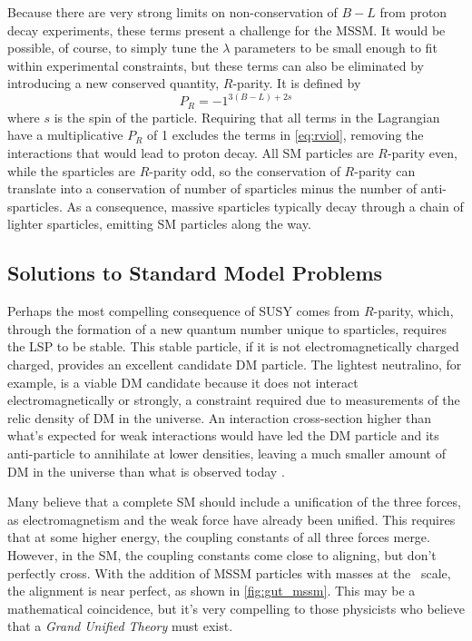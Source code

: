 Because there are very strong limits on non-conservation of $B-L$ from proton decay experiments, these terms present a challenge for the \ac{MSSM}. It would be possible, of course, to simply tune the $\lambda$ parameters to be small enough to fit within experimental constraints, but these terms can also be eliminated by introducing a new conserved quantity, $R$-parity. It is defined by
%
\begin{equation}
P_R = -1^{3(B-L)+2s}
\end{equation}
%
where $s$ is the spin of the particle. Requiring that all terms in the Lagrangian have a multiplicative $P_R$ of 1 excludes the terms in \autoref{eq:rviol}, removing the interactions that would lead to proton decay. All \ac{SM} particles are $R$-parity even, while the sparticles are $R$-parity odd, so the conservation of $R$-parity can translate into a conservation of number of sparticles minus the number of anti-sparticles. As a consequence, massive sparticles typically decay through a chain of lighter sparticles, emitting \ac{SM} particles along the way.  

\subsection{Solutions to Standard Model Problems}

Perhaps the most compelling consequence of \ac{SUSY} comes from $R$-parity, which, through the formation of a new quantum number u\-nique to sparticles, requires the \acf{LSP} to be stable. This stable particle, if it is not electromagnetically charged charged, provides an excellent candidate \ac{DM} particle. The lightest neutralino, for example, is a viable \ac{DM} candidate because it does not interact electromagnetically or strongly, a constraint required due to measurements of the relic density of \ac{DM} in the universe. An interaction cross-section higher than what's expected for weak interactions would have led the \ac{DM} particle and its anti-particle to annihilate at lower densities, leaving a much smaller amount of \ac{DM} in the universe than what is observed today \cite{astro-ph/9407006}.

Many believe that a complete \ac{SM} should include a unification of the three forces, as electromagnetism and the weak force have already been unified. This requires that at some higher energy, the coupling constants of all three forces merge. However, in the \ac{SM}, the coupling constants come close to aligning, but don't perfectly cross. With the addition of \ac{MSSM} particles with masses at the \tev~scale, the alignment is near perfect, as shown in \autoref{fig:gut_mssm}. This may be a mathematical coincidence, but it's very compelling to those physicists who believe that a \textit{Grand Unified Theory} must exist. 

